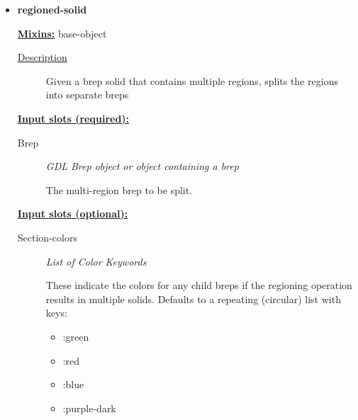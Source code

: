 \documentclass [11pt]{book}
\begin{document}
\begin{itemize}
\item {}
\label{prim:regioned-solid}
\textbf{regioned-solid}


\textbf{
\underline{Mixins:}} base-object





\begin{description}

\item [
\underline{Description}]


Given a brep solid that contains multiple regions, splits the regions into separate breps



\end{description}








\textbf{
\underline{Input slots (required):}}

\begin{description}

\item [Brep]
\emph{GDL Brep object or object containing a brep}

 The multi-region brep to be split.




\end{description}






\textbf{
\underline{Input slots (optional):}}

\begin{description}

\item [Section-colors]
\emph{List of Color Keywords}

 These indicate the colors for any child breps if the regioning operation results in
multiple solids. Defaults to a repeating (circular) list with keys:


\begin{itemize}

\item  :green 

\item  :red 

\item  :blue 

\item  :purple-dark 


\end{itemize}
\end{description}
\end{itemize}
\end{document}

